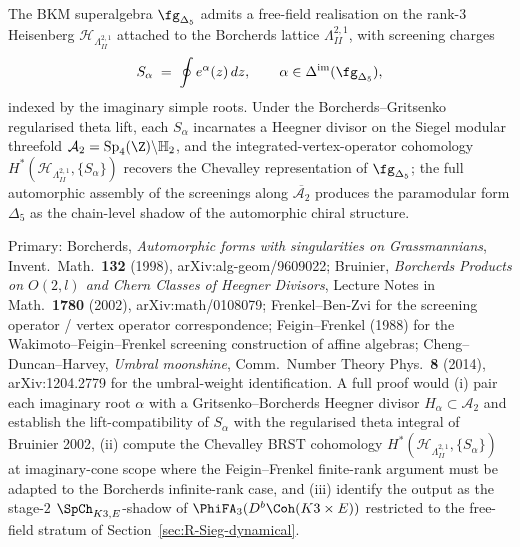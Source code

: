 \begin{conjecture}
\label{conj:k3y-free-field-heegner-programme}
\ClaimStatusConjectured
The BKM superalgebra $\fg_{\Delta_5}$ admits a free-field realisation
on the rank-$3$ Heisenberg $\mathcal H_{\Lambda^{2,1}_{II}}$ attached
to the Borcherds lattice $\Lambda^{2,1}_{II}$, with screening charges
\[
 S_\alpha \;=\; \oint e^{\alpha}(z)\,dz,
 \qquad \alpha \in \Delta^{\mathrm{im}}(\fg_{\Delta_5}),
\]
indexed by the imaginary simple roots. Under the Borcherds--Gritsenko
regularised theta lift, each $S_\alpha$ incarnates a Heegner divisor
on the Siegel modular threefold
$\mathcal A_2 = \mathrm{Sp}_4(\Z)\backslash\mathbb H_2$, and the
integrated-vertex-operator cohomology
$H^*(\mathcal H_{\Lambda^{2,1}_{II}}, \{S_\alpha\})$ recovers the
Chevalley representation of $\fg_{\Delta_5}$; the full automorphic
assembly of the screenings along
$\overline{\mathcal A_2}$ produces the paramodular form $\Delta_5$
as the chain-level shadow of the automorphic chiral structure.
\end{conjecture}

Primary: Borcherds, \emph{Automorphic forms with singularities on
Grassmannians}, Invent.\ Math.\ \textbf{132} (1998),
arXiv:alg-geom/9609022; Bruinier, \emph{Borcherds Products on
$O(2,l)$ and Chern Classes of Heegner Divisors}, Lecture Notes in
Math.\ \textbf{1780} (2002), arXiv:math/0108079; Frenkel--Ben-Zvi
\cite{FrenkelBenZvi} for the screening operator / vertex operator
correspondence; Feigin--Frenkel (1988) for the
Wakimoto--Feigin--Frenkel screening construction of affine algebras;
Cheng--Duncan--Harvey, \emph{Umbral moonshine}, Comm.\ Number Theory
Phys.\ \textbf{8} (2014), arXiv:1204.2779 for the umbral-weight
identification. A full proof would (i) pair each imaginary root
$\alpha$ with a Gritsenko--Borcherds Heegner divisor
$H_\alpha \subset \mathcal A_2$ and establish the lift-compatibility
of $S_\alpha$ with the regularised theta integral of Bruinier 2002,
(ii) compute the Chevalley BRST cohomology
$H^*(\mathcal H_{\Lambda^{2,1}_{II}}, \{S_\alpha\})$ at
imaginary-cone scope where the Feigin--Frenkel finite-rank argument
must be adapted to the Borcherds infinite-rank case, and
(iii) identify the output as the stage-$2$ $\SpCh_{K3,E}$-shadow of
$\PhiFA_3(D^b\Coh(K3\times E))$ restricted to the free-field stratum
of Section~\ref{sec:R-Sieg-dynamical}.

